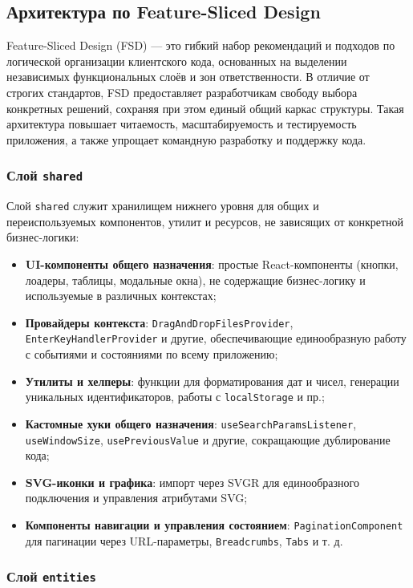 \subsection{Архитектура по Feature-Sliced Design}

Feature-Sliced Design (FSD) — это гибкий набор рекомендаций и подходов по логической организации клиентского кода, основанных на выделении независимых функциональных слоёв и зон ответственности. В отличие от строгих стандартов, FSD предоставляет разработчикам свободу выбора конкретных решений, сохраняя при этом единый общий каркас структуры. Такая архитектура повышает читаемость, масштабируемость и тестируемость приложения, а также упрощает командную разработку и поддержку кода.

\subsubsection{Слой \texttt{shared}}

Слой \texttt{shared} служит хранилищем нижнего уровня для общих и переиспользуемых компонентов, утилит и ресурсов, не зависящих от конкретной бизнес-логики:
\begin{itemize}
  \item \textbf{UI-компоненты общего назначения}: простые React-компоненты (кнопки, лоадеры, таблицы, модальные окна), не содержащие бизнес-логику и используемые в различных контекстах;
  \item \textbf{Провайдеры контекста}: \texttt{DragAndDropFilesProvider}, \texttt{EnterKeyHandlerProvider} и другие, обеспечивающие единообразную работу с событиями и состояниями по всему приложению;
  \item \textbf{Утилиты и хелперы}: функции для форматирования дат и чисел, генерации уникальных идентификаторов, работы с \texttt{localStorage} и пр.;
  \item \textbf{Кастомные хуки общего назначения}: \texttt{useSearchParamsListener}, \texttt{useWindowSize}, \texttt{usePreviousValue} и другие, сокращающие дублирование кода;
  \item \textbf{SVG-иконки и графика}: импорт через SVGR для единообразного подключения и управления атрибутами SVG;
  \item \textbf{Компоненты навигации и управления состоянием}: \texttt{PaginationComponent} для пагинации через URL-параметры, \texttt{Breadcrumbs}, \texttt{Tabs} и т. д.
\end{itemize}

\subsubsection{Слой \texttt{entities}}

